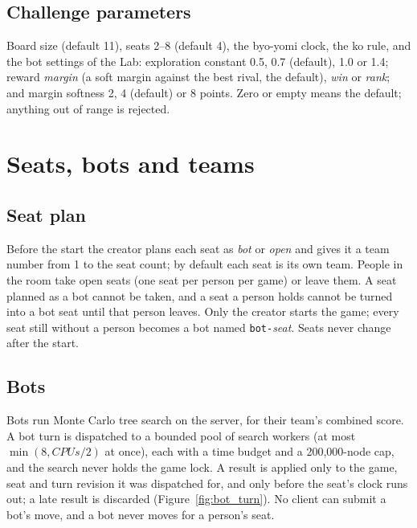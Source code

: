 \documentclass[11pt,oneside]{book}
\begin{document}
\section{Challenge parameters}
Board size (default 11), seats 2--8 (default 4), the byo-yomi clock, the ko rule,
and the bot settings of the Lab: exploration constant 0.5, 0.7 (default), 1.0
or 1.4; reward \emph{margin} (a soft margin against the best rival, the
default), \emph{win} or \emph{rank}; and margin softness 2, 4 (default) or 8
points. Zero or empty means the default; anything out of range is rejected.

\chapter{Seats, bots and teams}
\section{Seat plan}
Before the start the creator plans each seat as \emph{bot} or \emph{open} and
gives it a team number from 1 to the seat count; by default each seat is its
own team. People in the room take open seats (one seat per person per game) or
leave them. A seat planned as a bot cannot be taken, and a seat a person holds
cannot be turned into a bot seat until that person leaves. Only the creator
starts the game; every seat still without a person becomes a bot named
\texttt{bot-}\emph{seat}. Seats never change after the start.

\section{Bots}
Bots run Monte Carlo tree search on the server, for their team's combined
score. A bot turn is dispatched to a bounded pool of search workers (at most
\(\min(8, \textit{CPUs}/2)\) at once), each with a time budget and a 200,000-node
cap, and the search never holds the game lock. A result is applied only to the
game, seat and turn revision it was dispatched for, and only before the seat's
clock runs out; a late result is discarded (Figure~\ref{fig:bot_turn}). No
client can submit a bot's move, and a bot never moves for a person's seat.
\end{document}
